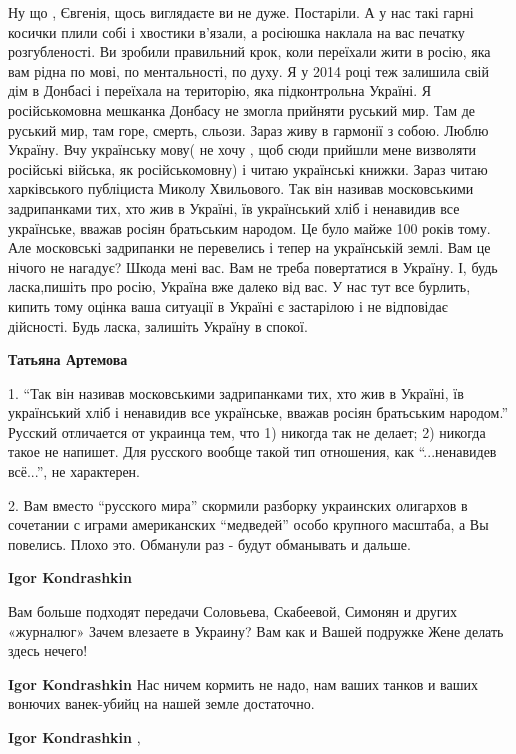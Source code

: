 \begin{itemize}
Ну що , Євгенія, щось виглядаєте ви не дуже. Постаріли. А у нас такі гарні
косички плили собі і хвостики в'язали, а росіюшка наклала на вас печатку
розгубленості. Ви зробили правильний крок, коли переїхали жити в росію, яка вам
рідна по мові, по ментальності, по духу. Я у 2014 році теж залишила свій дім в
Донбасі і переїхала на територію, яка підконтрольна Україні. Я російськомовна
мешканка Донбасу не змогла прийняти руський мир. Там де руський мир, там горе,
смерть, сльози. Зараз живу в гармонії з собою. Люблю Україну. Вчу українську
мову( не хочу , щоб сюди прийшли мене визволяти російські війська, як
російськомовну) і читаю українські книжки. Зараз читаю харківського публіциста
Миколу Хвильового. Так він називав московськими задрипанками тих, хто жив в
Україні, їв український хліб і ненавидив все українське, вважав росіян
братьським народом. Це було майже 100 років тому. Але московські задрипанки не
перевелись і тепер на українській землі. Вам це нічого не нагадує? Шкода мені
вас. Вам не треба повертатися в Україну. І, будь ласка,пишіть про росію,
Україна вже далеко від вас. У нас тут все бурлить, кипить тому оцінка ваша
ситуації в Україні є застарілою і не відповідає дійсності. Будь ласка,
залишіть Україну в спокої.

\begin{itemize} %
\textbf{Татьяна Артемова} 

1. \enquote{Так він називав московськими задрипанками тих, хто жив в Україні, їв
український хліб і ненавидив все українське, вважав росіян братьським народом.}
Русский отличается от украинца тем, что 1) никогда так не делает; 2) никогда
такое не напишет. Для русского вообще такой тип отношения, как \enquote{...ненавидев
всё...}, не характерен. 

2. Вам вместо \enquote{русского мира} скормили разборку украинских олигархов в
сочетании с играми американских \enquote{медведей} особо крупного масштаба, а Вы
повелись. Плохо это. Обманули раз - будут обманывать и дальше.


\textbf{Igor Kondrashkin} 

Вам больше подходят передачи Соловьева, Скабеевой, Симонян и других «журналюг»
Зачем влезаете в Украину? Вам как и Вашей подружке Жене делать здесь нечего!


\textbf{Igor Kondrashkin} Нас ничем кормить не надо, нам ваших танков и ваших вонючих ванек-убийц на нашей земле достаточно.

\textbf{Igor Kondrashkin} , 


\end{itemize}
\end{itemize}
